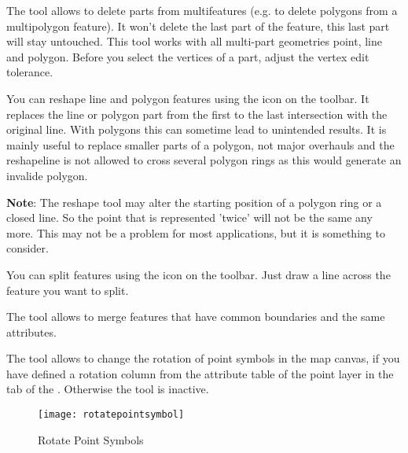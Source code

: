 
The  tool allows to delete parts
from multifeatures (e.g. to delete polygons from a multipolygon feature). It
won't delete the last part of the feature, this last part will stay untouched.
This tool works with all multi-part geometries point, line and polygon. Before
you select the vertices of a part, adjust the vertex edit tolerance.


You can reshape line and polygon features using the
 icon on the toolbar. It
replaces the line or polygon part from the first to the last intersection
with the original line. With polygons this can sometime lead to unintended
results. It is mainly useful to replace smaller parts of a polygon, not major
overhauls and the reshapeline is not allowed to cross several polygon rings
as this would generate an invalide polygon.

\textbf{Note}: The reshape tool may alter the starting position of a polygon
ring or a closed line. So the point that is represented 'twice' will not be
the same any more. This may not be a problem for most applications, but it is
something to consider.


You can split features using the  icon on the toolbar. Just draw a line across the feature you
want to split.


The  tool allows to
merge features that have common boundaries and the same attributes.


The  tool
allows to change the rotation of point symbols in the map canvas, if
you have defined a rotation column from the attribute table of the point
layer in the  tab of the .
Otherwise the tool is inactive.

\begin{figure}[ht]
   \centering
   \texttt{[image: rotatepointsymbol]}
   \caption{Rotate Point Symbols \nixcaption}\label{fig:rotatepoint}
\end{figure}

